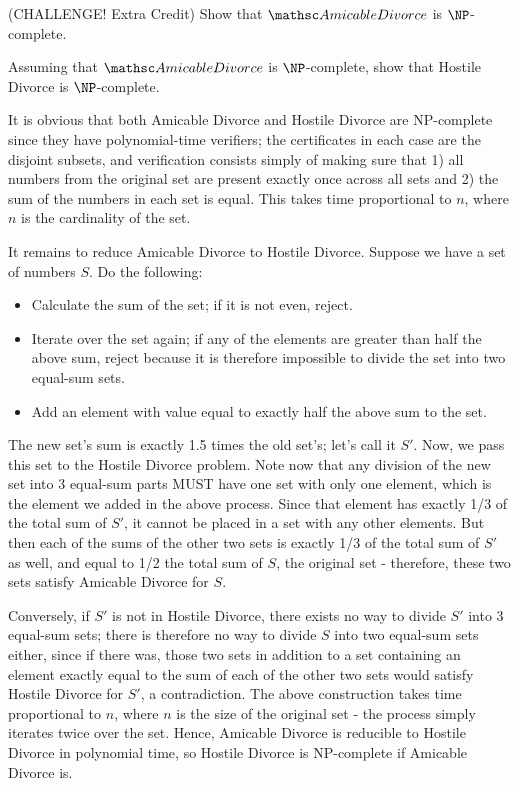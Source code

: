 \documentclass[solution, letterpaper]{cs121}
\begin{document}
\subproblem (CHALLENGE! Extra Credit) Show that $\AD$ is $\NP$-complete.

\subproblem Assuming that $\AD$ is $\NP$-complete, show that {\sc Hostile Divorce} is $\NP$-complete.

\begin{solution}

\subsolution 

\subsolution It is obvious that both {\sc Amicable Divorce} and {\sc Hostile Divorce} are NP-complete since they have polynomial-time verifiers; the certificates in each case are the disjoint subsets, and verification consists simply of making sure that 1) all numbers from the original set are present exactly once across all sets and 2) the sum of the numbers in each set is equal.  This takes time proportional to $n$, where $n$ is the cardinality of the set.  

It remains to reduce {\sc Amicable Divorce} to {\sc Hostile Divorce}.  Suppose we have a set of numbers $S$.  Do the following:

\begin{itemize}
	\setlength\itemsep{0cm}
	\item Calculate the sum of the set; if it is not even, reject.
	\item Iterate over the set again; if any of the elements are greater than half the above sum, reject because it is therefore impossible to divide the set into two equal-sum sets.
	\item Add an element with value equal to exactly half the above sum to the set.
\end{itemize}

The new set's sum is exactly 1.5 times the old set's; let's call it $S'$.  Now, we pass this set to the {\sc Hostile Divorce} problem.  Note now that any division of the new set into 3 equal-sum parts MUST have one set with only one element, which is the element we added in the above process.  Since that element has exactly 1/3 of the total sum of $S'$, it cannot be placed in a set with any other elements.  But then each of the sums of the other two sets is exactly 1/3 of the total sum of $S'$ as well, and equal to 1/2 the total sum of $S$, the original set - therefore, these two sets satisfy {\sc Amicable Divorce} for $S$.  

Conversely, if $S'$ is not in {\sc Hostile Divorce}, there exists no way to divide $S'$ into 3 equal-sum sets; there is therefore no way to divide $S$ into two equal-sum sets either, since if there was, those two sets in addition to a set containing an element exactly equal to the sum of each of the other two sets would satisfy {\sc Hostile Divorce} for $S'$, a contradiction.  The above construction takes time proportional to $n$, where $n$ is the size of the original set - the process simply iterates twice over the set.  Hence, {\sc Amicable Divorce} is reducible to {\sc Hostile Divorce} in polynomial time, so {\sc Hostile Divorce} is NP-complete if {\sc Amicable Divorce} is.

\end{solution}
\end{document}
